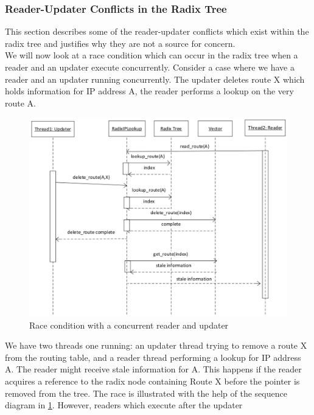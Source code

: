 \documentclass[a4paper]{article}
\begin{document}
\subsubsection{Reader-Updater Conflicts in the Radix Tree}
This section describes some of the reader-updater conflicts which
exist within the radix tree and justifies why they are not a source
for concern.\\

We will now look at a race condition which can occur in the radix tree
when a reader and an updater execute concurrently. Consider a case
where we have a reader and an updater running concurrently. The
updater deletes route X which holds information for IP address A, the reader performs a lookup on the very
route A.\\
\begin{figure}[tph]
\begin{center}
\includegraphics[scale=0.6]{../images/diagrams/race1eps.eps}
\end{center}
\caption{Race condition with a concurrent reader and updater}
\label{race1figure}
\end{figure}
We have two threads one running: an updater thread trying to remove a
route X from the routing table, and a reader thread performing a
lookup for IP address A. The reader might receive stale information
for A. This happens if the reader acquires a reference to the radix
node containing Route X before the pointer is removed from the
tree. The race is illustrated with the help of the sequence diagram in
\ref{race1figure}. However, readers which execute after the updater
\end{document}
